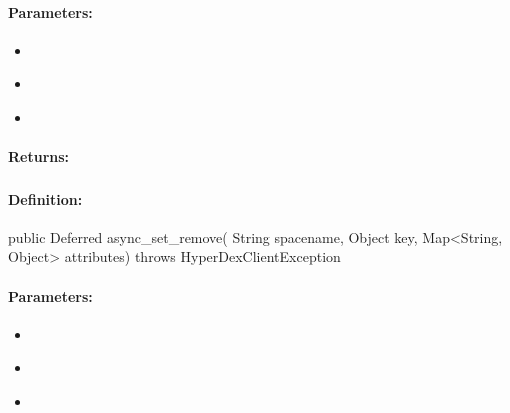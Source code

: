 \paragraph{Parameters:}
\begin{itemize}[noitemsep]
\item {}\\

\item {}\\

\item {}\\

\end{itemize}

\paragraph{Returns:}


\pagebreak
\subsubsection{}
\label{api:java:async_set_remove}


\paragraph{Definition:}
\begin{javacode}
public Deferred async_set_remove(
        String spacename,
        Object key,
        Map<String, Object> attributes) throws HyperDexClientException
\end{javacode}

\paragraph{Parameters:}
\begin{itemize}[noitemsep]
\item {}\\

\item {}\\

\item {}\\

\end{itemize}


